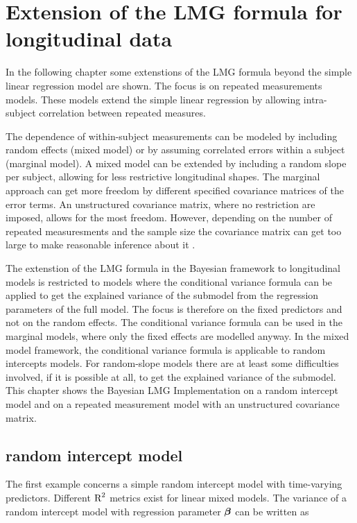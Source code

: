\documentclass[11pt,a4paper,twoside]{book}
\begin{document}





\chapter{Extension of the LMG formula for longitudinal data}

In the following chapter some extenstions of the LMG formula beyond the simple linear regression model are shown. The focus is on repeated measurements models. These models extend the simple linear regression by allowing intra-subject correlation between repeated measures.

The dependence of within-subject measurements can be modeled by including random effects (mixed model) or by assuming correlated errors within a subject (marginal model). A mixed model can be extended by including a random slope per subject, allowing for less restrictive longitudinal shapes. The marginal approach can get more freedom by different specified covariance matrices of the error terms. An unstructured covariance matrix, where no restriction are imposed, allows for the most freedom. However, depending on the number of repeated measuresments and the sample size the covariance matrix can get too large to make reasonable inference about it \citep{Fitzmaurice2011}. 

The extenstion of the LMG formula in the Bayesian framework to longitudinal models is restricted to models where the conditional variance formula can  be applied to get the explained variance of the submodel from the regression parameters of the full model. The focus is therefore on the fixed predictors and not on the random effects. The conditional variance formula can be used in the marginal models, where only the fixed effects are modelled anyway. In the mixed model framework, the conditional variance formula is applicable to random intercepts models. For random-slope models there are at least some difficulties involved, if it is possible at all, to get the explained variance of the submodel. This chapter shows the Bayesian LMG Implementation on a random intercept model and on a repeated measurement model with an unstructured covariance matrix.  


\section{random intercept model}
The first example concerns a simple random intercept model with time-varying predictors.  Different $\text{R}^2$ metrics exist for linear mixed models. The variance of a random intercept model with regression parameter ${\boldsymbol{\beta}}$ can be written as
\end{document}
